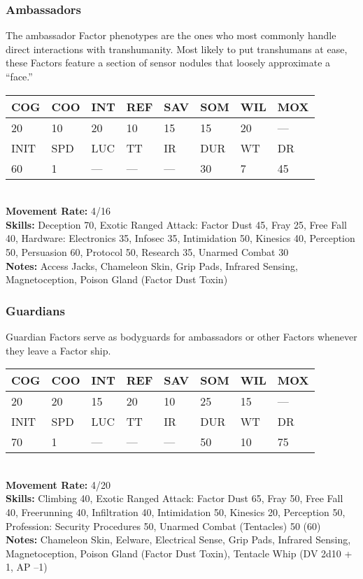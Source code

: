 \subsubsection{Ambassadors}
The ambassador Factor phenotypes are the ones who 
most commonly handle direct interactions with transhumanity.
Most likely to put transhumans at ease,
these Factors feature a section of sensor nodules that 
loosely approximate a ``face.''
\\
\begin{tabular}{|l|l|l|l|l|l|l|l|}
\hline
COG & COO & INT & REF & SAV & SOM & WIL & MOX \\
\hline
20 & 10 & 20 & 10 & 15 & 15 & 20 & — \\
\hline
INIT & SPD & LUC & TT & IR & DUR & WT & DR \\
\hline
60 & 1 & — & — & — & 30 & 7 & 45 \\
\hline
\end{tabular}
\\
\textbf{Movement Rate: }4/16 \\
\textbf{Skills:} Deception 70, Exotic Ranged Attack: Factor Dust 45, Fray 25, Free Fall 40, Hardware: Electronics 35, Infosec 35, Intimidation 50, Kinesics 40, Perception 50, Persuasion 60, Protocol 50, Research 35, Unarmed Combat 30 \\
\textbf{Notes:  }Access Jacks, Chameleon Skin, Grip Pads, Infrared Sensing, Magnetoception, Poison Gland (Factor Dust Toxin)

\subsubsection{Guardians}

Guardian Factors serve as bodyguards for ambassadors 
or other Factors whenever they leave a Factor ship.
\\
\begin{tabular}{|l|l|l|l|l|l|l|l|}
\hline
COG & COO & INT & REF & SAV & SOM & WIL & MOX \\
\hline
20 & 20 & 15 & 20 & 10 & 25 & 15 & — \\
\hline
INIT & SPD & LUC & TT & IR & DUR & WT & DR \\
\hline
70 & 1 & — & — & — & 50 & 10 & 75 \\
\hline
\end{tabular}
\\
\textbf{Movement Rate: }4/20 \\
\textbf{Skills:} Climbing 40, Exotic Ranged Attack: Factor Dust 65, Fray 50, Free Fall 40, Freerunning 40, Infiltration 40, Intimidation 50, Kinesics 20, Perception 50, Profession: Security Procedures 50, Unarmed Combat (Tentacles) 50 (60) \\
\textbf{Notes:} Chameleon Skin, Eelware, Electrical Sense, Grip Pads, Infrared Sensing, Magnetoception, Poison Gland (Factor Dust Toxin), Tentacle Whip (DV 2d10 + 1, AP –1)


